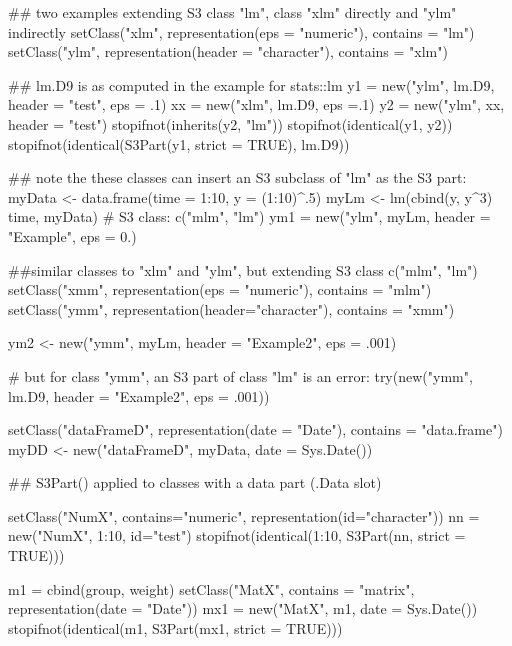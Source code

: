 %
\begin{Examples}
\begin{ExampleCode}
## two examples extending S3 class "lm", class "xlm"  directly and "ylm" indirectly
setClass("xlm", representation(eps = "numeric"), contains = "lm")
setClass("ylm", representation(header = "character"), contains = "xlm")

## lm.D9 is as computed in the example for stats::lm
y1 = new("ylm", lm.D9, header = "test", eps = .1)
xx = new("xlm", lm.D9, eps =.1)
y2 = new("ylm", xx, header = "test")
stopifnot(inherits(y2, "lm"))
stopifnot(identical(y1, y2))
stopifnot(identical(S3Part(y1, strict = TRUE), lm.D9))

## note the these classes can insert an S3 subclass of "lm" as the S3 part:
myData <- data.frame(time = 1:10, y = (1:10)^.5)
myLm <- lm(cbind(y, y^3)  ~ time, myData) # S3 class: c("mlm", "lm")
ym1 = new("ylm", myLm, header = "Example", eps = 0.)

##similar classes to "xlm" and "ylm", but extending S3 class c("mlm", "lm")
setClass("xmm", representation(eps = "numeric"), contains = "mlm")
setClass("ymm", representation(header="character"), contains = "xmm")

ym2 <- new("ymm", myLm, header = "Example2", eps = .001)

# but for class "ymm", an S3 part of class "lm" is an error:
try(new("ymm", lm.D9, header = "Example2", eps = .001))

setClass("dataFrameD", representation(date = "Date"), contains = "data.frame")
myDD <- new("dataFrameD", myData, date = Sys.Date())

## S3Part() applied to classes with a data part (.Data slot)

setClass("NumX", contains="numeric", representation(id="character"))
nn = new("NumX", 1:10, id="test")
stopifnot(identical(1:10, S3Part(nn, strict = TRUE)))
          
m1 = cbind(group, weight)
setClass("MatX", contains = "matrix", representation(date = "Date"))
mx1 = new("MatX", m1, date = Sys.Date())
stopifnot(identical(m1, S3Part(mx1, strict = TRUE)))


\end{ExampleCode}
\end{Examples}
